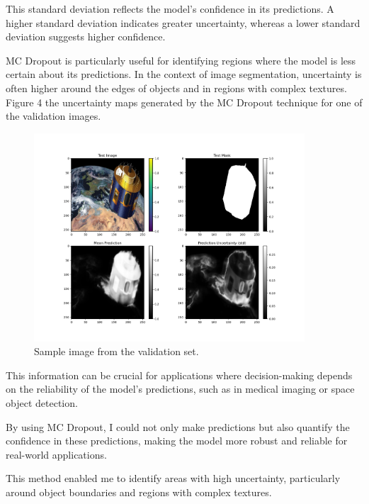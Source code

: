 \documentclass{article}
\begin{document}
This standard deviation reflects the model's confidence in its predictions. A higher standard deviation indicates greater 
uncertainty, whereas a lower standard deviation suggests higher confidence. 

MC Dropout is particularly useful for identifying regions where the model is less certain about its predictions. In the 
context of image segmentation, uncertainty is often higher around the edges of objects and in regions with complex textures. 
Figure 4 the uncertainty maps generated by the MC Dropout technique for one of the validation images.

\begin{figure}[h]
    \centering
    \includegraphics[width=0.9\textwidth]{../images/MC_dropout/test_image[0].png}
    \caption{Sample image from the validation set.}
    \label{fig:mc_dropout_single_image}
\end{figure}
\vspace{1em}
This information can be crucial for applications where decision-making depends on the reliability of the model's predictions, 
such as in medical imaging or space object detection.

By using MC Dropout, I could not only make predictions but also quantify the confidence in these predictions, making the 
model more robust and reliable for real-world applications.










This method enabled me to identify areas with high uncertainty, particularly around object boundaries 
and regions with complex textures.
\end{document}
